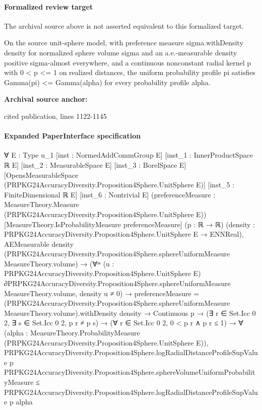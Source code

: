 \documentclass[10pt]{article}
\begin{document}
\paragraph{Formalized review target}
The archival source above is not asserted equivalent to this formalized target.
\begin{ReviewVerbatim}
On the source unit-sphere model, with preference measure sigma.withDensity density for normalized sphere volume sigma and an a.e.-measurable density positive sigma-almost everywhere, and a continuous nonconstant radial kernel p with 0 < p <= 1 on realized distances, the uniform probability profile pi satisfies Gamma(pi) <= Gamma(alpha) for every probability profile alpha.
\end{ReviewVerbatim}

\textbf{Archival source anchor:} {\footnotesize\raggedright cited publication, lines 1122-\allowbreak{}1145\par}
\paragraph{Expanded PaperInterface specification}
\begin{ReviewVerbatim}
∀ {E : Type u_1} [inst : NormedAddCommGroup E] [inst_1 : InnerProductSpace ℝ E] [inst_2 : MeasurableSpace E]
  [inst_3 : BorelSpace E] [OpensMeasurableSpace (PRPKG24AccuracyDiversity.Proposition4Sphere.UnitSphere E)]
  [inst_5 : FiniteDimensional ℝ E] [inst_6 : Nontrivial E]
  (preferenceMeasure : MeasureTheory.Measure (PRPKG24AccuracyDiversity.Proposition4Sphere.UnitSphere E))
  [MeasureTheory.IsProbabilityMeasure preferenceMeasure] (p : ℝ → ℝ)
  (density : PRPKG24AccuracyDiversity.Proposition4Sphere.UnitSphere E → ENNReal),
  AEMeasurable density (PRPKG24AccuracyDiversity.Proposition4Sphere.sphereUniformMeasure MeasureTheory.volume) →
    (∀ᵐ (u :
        PRPKG24AccuracyDiversity.Proposition4Sphere.UnitSphere
          E) ∂PRPKG24AccuracyDiversity.Proposition4Sphere.sphereUniformMeasure MeasureTheory.volume,
        density u ≠ 0) →
      preferenceMeasure =
          (PRPKG24AccuracyDiversity.Proposition4Sphere.sphereUniformMeasure MeasureTheory.volume).withDensity density →
        Continuous p →
          (∃ r ∈ Set.Icc 0 2, ∃ s ∈ Set.Icc 0 2, p r ≠ p s) →
            (∀ r ∈ Set.Icc 0 2, 0 < p r ∧ p r ≤ 1) →
              ∀ (alpha : MeasureTheory.ProbabilityMeasure (PRPKG24AccuracyDiversity.Proposition4Sphere.UnitSphere E)),
                PRPKG24AccuracyDiversity.Proposition4Sphere.logRadialDistanceProfileSupValue p
                    PRPKG24AccuracyDiversity.Proposition4Sphere.sphereVolumeUniformProbabilityMeasure ≤
                  PRPKG24AccuracyDiversity.Proposition4Sphere.logRadialDistanceProfileSupValue p alpha
\end{ReviewVerbatim}
\end{document}
